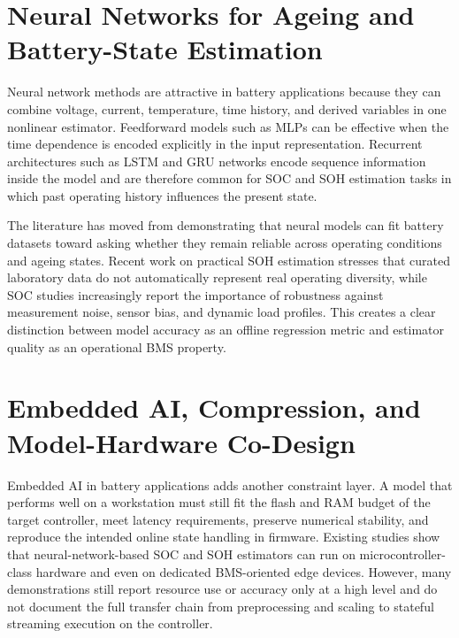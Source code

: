 \documentclass[
    a4paper,
    12pt,
    titlepage,
    bibliography=totoc,
    twoside=on,
    parskip=false,
    numbers=noenddot,
    cleardoublepage=empty,
    DIV=12,
    BCOR=12.0mm,
    headheight=36pt,
    headings=openright
]{scrreprt}
\begin{document}
\section{Neural Networks for Ageing and Battery-State Estimation}
Neural network methods are attractive in battery applications because they can combine voltage, current, temperature, time history, and derived variables in one nonlinear estimator.\autocite{ahmedRoleDeepLearning2026} Feedforward models such as MLPs can be effective when the time dependence is encoded explicitly in the input representation. Recurrent architectures such as LSTM and GRU networks encode sequence information inside the model and are therefore common for SOC and SOH estimation tasks in which past operating history influences the present state.\autocite{liptonCriticalReviewRecurrent2015,mondalEstimatingStateofChargeLithiumIon2024,liOnlineCapacityEstimation2021,sunStateofchargeEstimationSodiumion2024}

The literature has moved from demonstrating that neural models can fit battery datasets toward asking whether they remain reliable across operating conditions and ageing states. Recent work on practical SOH estimation stresses that curated laboratory data do not automatically represent real operating diversity, while SOC studies increasingly report the importance of robustness against measurement noise, sensor bias, and dynamic load profiles.\autocite{chenPracticalDatadrivenBattery2025,liRobustnessSOCEstimation2015,naseriReliableWirelessBMS2025} This creates a clear distinction between model accuracy as an offline regression metric and estimator quality as an operational BMS property.

\section{Embedded AI, Compression, and Model-Hardware Co-Design}
Embedded AI in battery applications adds another constraint layer. A model that performs well on a workstation must still fit the flash and RAM budget of the target controller, meet latency requirements, preserve numerical stability, and reproduce the intended online state handling in firmware.\autocite{cordova-cardenasEdgeAIPractice2025,linTinyMachineLearning2023,naguibMicroprocessorExecutionTime2022} Existing studies show that neural-network-based SOC and SOH estimators can run on microcontroller-class hardware and even on dedicated BMS-oriented edge devices.\autocite{giazitzisCaseStudyTiny2024,crocioniLiIonBatteriesParameter2020,Embedded_AI_only_SOC_mobile,shiueDesignImplementationDecentralized2026} However, many demonstrations still report resource use or accuracy only at a high level and do not document the full transfer chain from preprocessing and scaling to stateful streaming execution on the controller.
\end{document}
